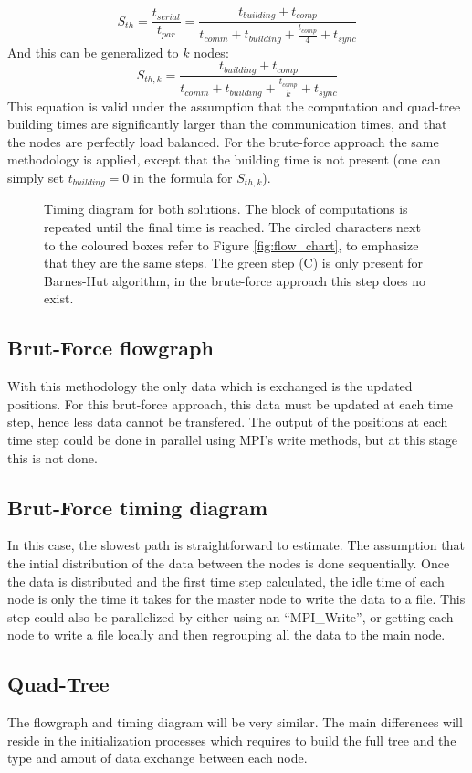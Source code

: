 \[S_{th} = \frac{t_{serial}}{t_{par}} = \frac{t_{building} + t_{comp}}{t_{comm} + t_{building } + \frac{t_{comp}}{4} + t_{sync}}\]
And this can be generalized to $k$ nodes: 
\[S_{th,k} = \frac{t_{building} + t_{comp}}{ t_{comm} + t_{building} + \frac{t_{comp}}{k} + t_{sync}}\]
This equation is valid under the assumption that the computation and quad-tree building times are significantly larger than the communication times, and that the nodes are perfectly load balanced. For the brute-force approach the same methodology is applied, except that the building time is not present (one can simply set $t_{building}=0$ in the formula for $S_{th,k}$).

\begin{figure}[H]
\centering
{}
\caption{Timing diagram for both solutions. The block of computations is repeated until the final time is reached. The circled characters next to the coloured boxes refer to Figure \ref{fig:flow_chart}, to emphasize that they are the same steps. The green step (C) is only present for Barnes-Hut algorithm, in the brute-force approach this step does no exist.}
\label{fig:timing}
\end{figure}

\subsection{Brut-Force flowgraph} With this methodology the only data which is exchanged is the updated positions. For this brut-force approach, this data must be updated at each time step, hence less data cannot be transfered. The output of the positions at each time step could be done in parallel using MPI's write methods, but at this stage this is not done. 

\subsection{Brut-Force timing diagram}
In this case, the slowest path is straightforward to estimate. The assumption that the intial distribution of the data between the nodes is done sequentially. Once the data is distributed and the first time step calculated, the idle time of each node is only the time it takes for the master node to write the data to a file. This step could also be parallelized by either using an ``MPI\_Write'', or getting each node to write a file locally and then regrouping all the data to the main node. 



\subsection{Quad-Tree}
The flowgraph and timing diagram will be very similar. The main differences will reside in the initialization processes which requires to build the full tree and the type and amout of data exchange between each node. 
